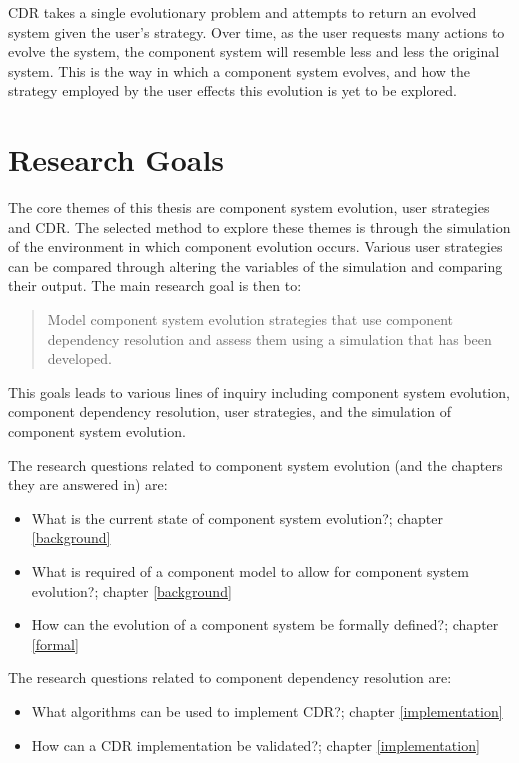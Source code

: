 CDR takes a single evolutionary problem and attempts to return an evolved system given the user's strategy.
Over time, as the user requests many actions to evolve the system, the component system will resemble less and less the original system.
This is the way in which a component system evolves, and how the strategy employed by the user effects this evolution is yet to be explored. 

\section{Research Goals}
The core themes of this thesis are component system evolution, user strategies and CDR.
The selected method to explore these themes is through the simulation of the environment in which component evolution occurs.
Various user strategies can be compared through altering the variables of the simulation and comparing their output.
The main research goal is then to:
\begin{quote}
Model component system evolution strategies that use component dependency resolution and assess them using a simulation that has been developed.
\end{quote}

This goals leads to various lines of inquiry including component system evolution, component dependency resolution, user strategies, and the simulation of component system evolution.

The research questions related to component system evolution (and the chapters they are answered in) are:
\begin{itemize}
	\item What is the current state of component system evolution?; chapter \ref{background}
	\item What is required of a component model to allow for component system evolution?; chapter \ref{background}
	\item How can the evolution of a component system be formally defined?; chapter \ref{formal}
\end{itemize}

The research questions related to component dependency resolution are:
\begin{itemize}
  \item What algorithms can be used to implement CDR?; chapter \ref{implementation}
  \item How can a CDR implementation be validated?; chapter \ref{implementation}
\end{itemize}

